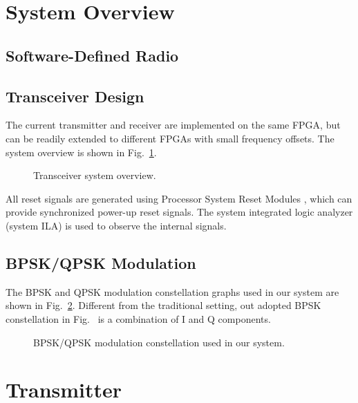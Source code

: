 \documentclass[journal,twoside]{IEEEtran}
\begin{document}
  \section{System Overview}

    \subsection{Software-Defined Radio}

    \subsection{Transceiver Design}

      The current transmitter and receiver are implemented on the same FPGA,
      but can be readily extended to different FPGAs with small frequency offsets.
      The system overview is shown in Fig.~\ref{fig:system_overview}.
      \begin{figure}[htbp]
        \centering
        
        \caption{Transceiver system overview.}
        \label{fig:system_overview}
      \end{figure}

      All reset signals are generated using Processor System Reset Modules \cite{xilinx:pg164},
      which can provide synchronized power-up reset signals.
      The system integrated logic analyzer (system ILA) \cite{xilinx:pg261} is used to observe the internal signals.

    \subsection{BPSK/QPSK Modulation}

      The BPSK and QPSK modulation constellation graphs used in our system are shown in Fig.~\ref{fig:constellation}.
      Different from the traditional setting, out adopted BPSK constellation in Fig.~
      is a combination of I and Q components.
      \begin{figure}[htbp]
        \hfill%
        \caption{BPSK/QPSK modulation constellation used in our system.}
        \label{fig:constellation}
      \end{figure}

  \section{Transmitter}
\end{document}
